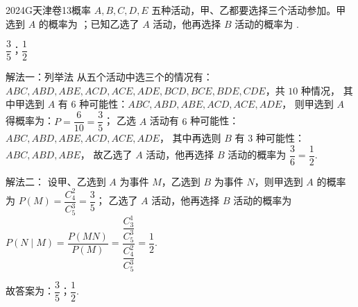 
\begin{problem}{2024}{G}{天津卷}{13}{概率}
$ A,B,C,D,E $ 五种活动，甲、乙都要选择三个活动参加。甲选到 $ A $ 的概率为 \underline{\hspace{4em}}；已知乙选了 $ A $ 活动，他再选择 $ B $ 活动的概率为 \underline{\hspace{4em}}.
\end{problem}

\begin{answer}
$\dfrac{3}{5}$；$\dfrac{1}{2}$
\end{answer}

\begin{solutions}
解法一：列举法  
从五个活动中选三个的情况有：  
$ ABC,ABD,ABE,ACD,ACE,ADE,BCD,BCE,BDE,CDE $，共 $10$ 种情况，  
其中甲选到 $ A $ 有 $6$ 种可能性：$ ABC,ABD,ABE,ACD,ACE,ADE $，  
则甲选到 $ A $ 得概率为：$ P=\dfrac{6}{10}=\dfrac{3}{5} $；  
乙选 $ A $ 活动有 $6$ 种可能性：$ ABC,ABD,ABE,ACD,ACE,ADE $，  
其中再选则 $ B $ 有 $3$ 种可能性：$ ABC,ABD,ABE $，  
故乙选了 $ A $ 活动，他再选择 $ B $ 活动的概率为 $ \dfrac{3}{6}=\dfrac{1}{2} $.  

解法二：  
设甲、乙选到 $ A $ 为事件 $ M $，乙选到 $ B $ 为事件 $ N $，则甲选到 $ A $ 的概率为 $ P(M)=\dfrac{C_4^2}{C_5^3}=\dfrac{3}{5} $；  
乙选了 $ A $ 活动，他再选择 $ B $ 活动的概率为 $ P(N\mid M)=\dfrac{P(MN)}{P(M)}=\dfrac{\dfrac{C_3^1}{C_5^3}}{\dfrac{C_4^2}{C_5^3}}=\dfrac{1}{2} $.  

故答案为：$\dfrac{3}{5}$；$\dfrac{1}{2}$.
\end{solutions}